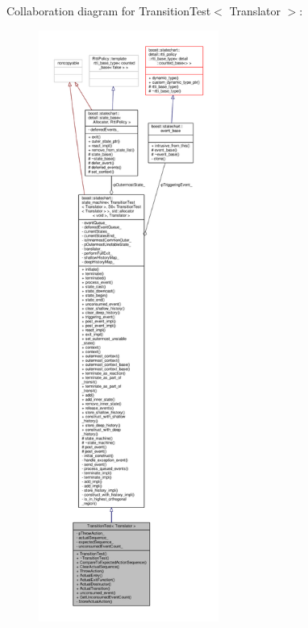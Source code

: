 Collaboration diagram for Transition\+Test$<$ Translator $>$\+:
\nopagebreak
\begin{figure}[H]
\begin{center}
\leavevmode
\includegraphics[height=550pt]{struct_transition_test__coll__graph}
\end{center}
\end{figure}

